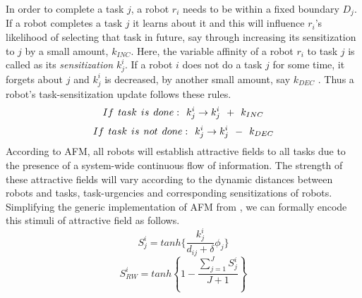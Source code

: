 In order to complete a task $j$, a robot $r_i$ needs to be within a fixed boundary $D_{j}$. If a robot completes a task $j$ it learns about it and this will influence $r_i$'s likelihood of selecting that task in future, say through increasing  its sensitization to $j$ by a small amount, $k_{INC}$. Here, the variable affinity of a robot $r_i$ to task $j$ is called as its {\em sensitization} $k^{i}_{j}$. If a robot $i$ does not do a task $j$ for some time, it forgets about $j$ and $k^i_j$ is decreased, by another small amount, say $k_{DEC}$ .
Thus a robot's task-sensitization update follows these rules.
\begin{equation}
 If\hspace*{0.15cm}task\hspace*{0.15cm}is\hspace*{0.15cm}done:\hspace*{0.15cm}  k^i_j \rightarrow   k^i_j \hspace*{0.15cm} + \hspace*{0.15cm} k_{INC}
\label{eqn:k-inc}
\end{equation}
\begin{equation}
 If\hspace*{0.15cm}task\hspace*{0.15cm}is\hspace*{0.15cm}not\hspace*{0.15cm}done:\hspace*{0.15cm}  k^i_j \rightarrow   k^i_j \hspace*{0.15cm} - \hspace*{0.15cm} k_{DEC}
\label{eqn:k-dec}
\end{equation}
According to AFM, all robots will establish attractive fields to all tasks due to the presence of a system-wide continuous flow of information. The strength of these attractive fields will vary according to the dynamic distances between robots and tasks, task-urgencies and corresponding sensitizations of robots. Simplifying the generic implementation of AFM from , we can formally encode this stimuli of attractive field as follows.
\begin{equation}
S_{j}^{i} = tanh\{\frac{k_{j}^{i}}{d_{ij}+\delta } \phi _{j}\}
\label{eqn:afm1}
\end{equation}
\begin{equation}
S^{i}_{RW} = tanh \left \{ 1 -  \frac{ \sum_{j=1}^{J} S^{i}_{j}}{J + 1} \right \}
\label{eqn:afm2}
\end{equation}

